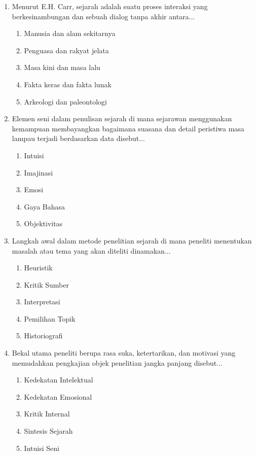 \documentclass[12pt, a4paper]{article}
\begin{document}
\begin{enumerate}[label=\arabic*.]
    \item Menurut E.H. Carr, sejarah adalah suatu proses interaksi yang berkesinambungan dan sebuah dialog tanpa akhir antara...
    \begin{enumerate}[label=\Alph*.]
        \item Manusia dan alam sekitarnya
        \item Penguasa dan rakyat jelata
        \item Masa kini dan masa lalu
        \item Fakta keras dan fakta lunak
        \item Arkeologi dan paleontologi
    \end{enumerate}

    \item Elemen seni dalam penulisan sejarah di mana sejarawan menggunakan kemampuan membayangkan bagaimana suasana dan detail peristiwa masa lampau terjadi berdasarkan data disebut...
    \begin{enumerate}[label=\Alph*.]
        \item Intuisi
        \item Imajinasi
        \item Emosi
        \item Gaya Bahasa
        \item Objektivitas
    \end{enumerate}

    \item Langkah awal dalam metode penelitian sejarah di mana peneliti menentukan masalah atau tema yang akan diteliti dinamakan...
    \begin{enumerate}[label=\Alph*.]
        \item Heuristik
        \item Kritik Sumber
        \item Interpretasi
        \item Pemilihan Topik
        \item Historiografi
    \end{enumerate}

    \item Bekal utama peneliti berupa rasa suka, ketertarikan, dan motivasi yang memudahkan pengkajian objek penelitian jangka panjang disebut...
    \begin{enumerate}[label=\Alph*.]
        \item Kedekatan Intelektual
        \item Kedekatan Emosional
        \item Kritik Internal
        \item Sintesis Sejarah
        \item Intuisi Seni
    \end{enumerate}


\end{enumerate}
\end{document}
